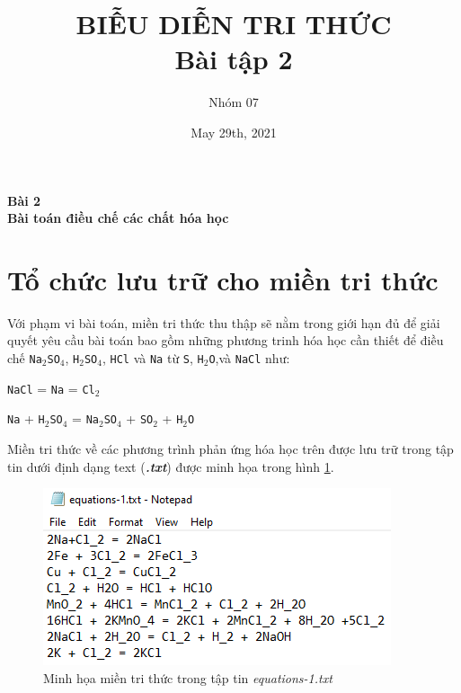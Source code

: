 \documentclass[a4paper]{article}
\title{BIỄU DIỄN TRI THỨC\\ Bài tập 2}
\author{Nhóm 07}
\date{May 29th, 2021}
\begin{document}
	\maketitle
	\begin{center}
		\LARGE{\textbf{Bài 2\\Bài toán điều chế các chất hóa học}}
	\end{center}
	
	\section{Tổ chức lưu trữ cho miền tri thức} 	
	
	Với phạm vi bài toán, miền tri thức thu thập sẽ nằm trong giới hạn đủ để giải quyết yêu cầu bài toán bao gồm những phương trinh hóa học cần thiết để điều chế \texttt{Na$_2$SO$_4$}, \texttt{H$_2$SO$_4$}, \texttt{HCl} và \texttt{Na} từ \texttt{S}, \texttt{H$_2$O},và \texttt{NaCl} như:
	
	\texttt{NaCl} = \texttt{Na} = \texttt{Cl$_2$}  
	
	\texttt{Na} + \texttt{H$_2$SO$_4$} = \texttt{Na$_2$SO$_4$} + \texttt{SO$_2$} + \texttt{H$_2$O}
	
	Miền tri thức về các phương trình phản ứng hóa học trên được lưu trữ trong tập tin dưới định dạng text (\textbf{\textit{.txt}}) được minh họa trong hình \ref{fig-2a:mien-tri-thuc}. 
	\begin{figure}[h]
		\centering
		\includegraphics[width=0.7\linewidth]{images/2a_mien-tri-thuc}
		\caption{Minh họa miền tri thức trong tập tin \textit{equations-1.txt}}
		\label{fig-2a:mien-tri-thuc}
	\end{figure}
	
\end{document}
